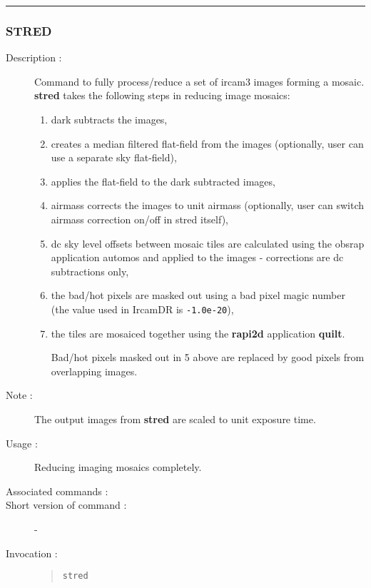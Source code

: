 \hrule 
\subsubsection*{\label{STRED}STRED}

\begin{description}

\item[Description :] Command to fully process/reduce a set of {\sc
ircam3} images forming a mosaic. {\bf stred} takes the following steps in
reducing image mosaics: 

\begin{enumerate}

\item dark subtracts the images, 

\item creates a median filtered flat-field from the images (optionally,
user can use a separate sky flat-field),

\item applies the flat-field to the dark subtracted images,

\item airmass corrects the images to unit airmass
(optionally, user can switch airmass correction on/off in stred itself),


\item dc sky level offsets between mosaic tiles are calculated using
the obsrap application automos and applied to the images - corrections
are dc subtractions only,

\item the bad/hot pixels are masked out using a bad pixel magic number
(the value used in {\sc IrcamDR} is {\tt -1.0e-20}), 

\item the tiles are mosaiced together using the {\bf rapi2d}
application {\bf quilt}.  

Bad/hot pixels masked out in 5 above are replaced
by good pixels from overlapping images.

\end{enumerate}

\item[Note :] The output images from {\bf stred} are scaled to unit 
exposure time.
\item[Usage :] Reducing imaging mosaics completely.
\item[Associated commands :] {\tt {}}
\item[Short version of command :] -
\item[Invocation :]

\begin{quote}{\tt  stred }\end{quote}

\end{description}

